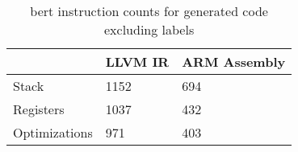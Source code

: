 \begin{table}[h!]
\centering
\begin{tabular}{p{}p{}p{}}
  \hline
 & LLVM IR & ARM Assembly \\ 
  \hline
Stack & 1152 & 694 \\ 
  Registers & 1037 & 432 \\ 
  Optimizations & 971 & 403 \\ 
   \hline
\end{tabular}
\caption{bert instruction counts for generated code excluding labels}
\end{table}
